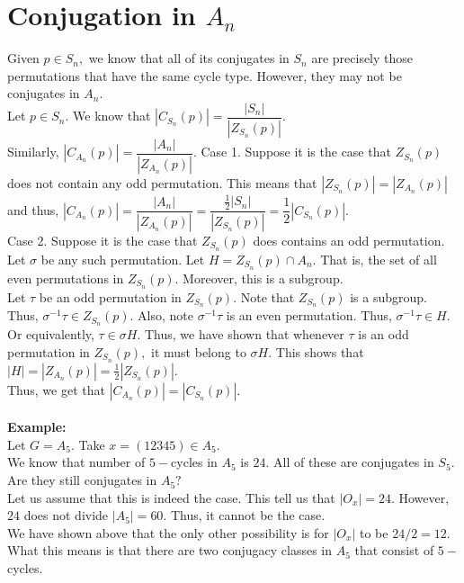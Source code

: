 \documentclass[12 pt, a4paper, toc=graduated, oneside]{article}
\theoremstyle{definition}
\begin{document}
\section{Conjugation in \texorpdfstring{$A_n$}{An}}

Given $p \in S_n,$ we know that all of its conjugates in $S_n$ are precisely those permutations that have the same cycle type. However, they may not be conjugates in $A_n.$ \\
Let $p \in S_n.$ We know that $|C_{S_n}(p)| = \dfrac{|S_n|}{|Z_{S_n}(p)|}.$\\
Similarly, $|C_{A_n}(p)| = \dfrac{|A_n|}{|Z_{A_n}(p)|}.$
Case 1. Suppose it is the case that $Z_{S_n}(p)$ does not contain any odd permutation. This means that $|Z_{S_n}(p)| = |Z_{A_n}(p)|$ and thus, $|C_{A_n}(p)| = \dfrac{|A_n|}{|Z_{A_n}(p)|} = \dfrac{\frac{1}{2}|S_n|}{|Z_{S_n}(p)|} = \dfrac{1}{2}|C_{S_n}(p)|.$\\
Case 2. Suppose it is the case that $Z_{S_n}(p)$ does contains an odd permutation. Let $\sigma$ be any such permutation. Let $H = Z_{S_n}(p) \cap A_n.$ That is, the set of all even permutations in $Z_{S_n}(p).$ Moreover, this is a subgroup.\\
Let $\tau$ be an odd permutation in $Z_{S_n}(p).$ Note that $Z_{S_n}(p)$ is a subgroup. Thus, $\sigma^{-1}\tau\in Z_{S_n}(p).$ Also, note $\sigma^{-1}\tau$ is an even permutation. Thus, $\sigma^{-1}\tau\in H.$ Or equivalently, $\tau \in \sigma H.$ Thus, we have shown that whenever $\tau$ is an odd permutation in $Z_{S_n}(p),$ it must belong to $\sigma H.$ This shows that $|H| = |Z_{A_n}(p)| = \frac{1}{2}|Z_{S_n}(p)|.$\\
Thus, we get that $|C_{A_n}(p)| = |C_{S_n}(p)|.$\\~\\

\textbf{Example:}\\
Let $G = A_5.$ Take $x = (12345) \in A_5.$\\
We know that number of $5-$cycles in $A_5$ is $24.$ All of these are conjugates in $S_5.$ Are they still conjugates in $A_5?$\\
Let us assume that this is indeed the case. This tell us that $|O_x| = 24.$ However, $24$ does not divide $|A_5| = 60.$ Thus, it cannot be the case.\\
We have shown above that the only other possibility is for $|O_x|$ to be $24/2 = 12.$\\
What this means is that there are two conjugacy classes in $A_5$ that consist of $5-$cycles.
\end{document}
